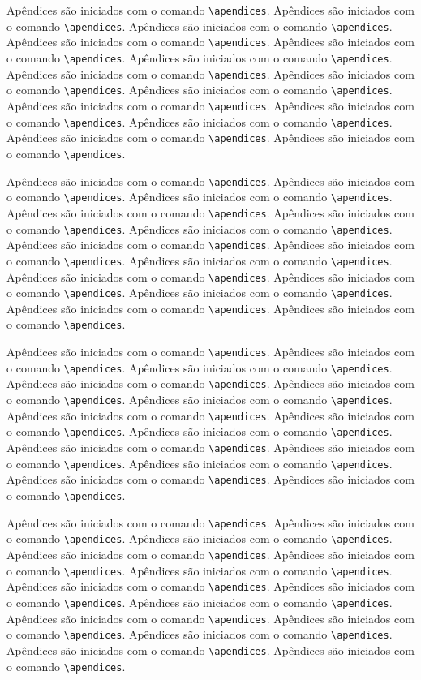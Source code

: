 Apêndices são iniciados com o comando \verb|\apendices|.
Apêndices são iniciados com o comando \verb|\apendices|.
Apêndices são iniciados com o comando \verb|\apendices|.
Apêndices são iniciados com o comando \verb|\apendices|.
Apêndices são iniciados com o comando \verb|\apendices|.
Apêndices são iniciados com o comando \verb|\apendices|.
Apêndices são iniciados com o comando \verb|\apendices|.
Apêndices são iniciados com o comando \verb|\apendices|.
Apêndices são iniciados com o comando \verb|\apendices|.
Apêndices são iniciados com o comando \verb|\apendices|.
Apêndices são iniciados com o comando \verb|\apendices|.
Apêndices são iniciados com o comando \verb|\apendices|.
Apêndices são iniciados com o comando \verb|\apendices|.
Apêndices são iniciados com o comando \verb|\apendices|.

Apêndices são iniciados com o comando \verb|\apendices|.
Apêndices são iniciados com o comando \verb|\apendices|.
Apêndices são iniciados com o comando \verb|\apendices|.
Apêndices são iniciados com o comando \verb|\apendices|.
Apêndices são iniciados com o comando \verb|\apendices|.
Apêndices são iniciados com o comando \verb|\apendices|.
Apêndices são iniciados com o comando \verb|\apendices|.
Apêndices são iniciados com o comando \verb|\apendices|.
Apêndices são iniciados com o comando \verb|\apendices|.
Apêndices são iniciados com o comando \verb|\apendices|.
Apêndices são iniciados com o comando \verb|\apendices|.
Apêndices são iniciados com o comando \verb|\apendices|.
Apêndices são iniciados com o comando \verb|\apendices|.
Apêndices são iniciados com o comando \verb|\apendices|.

Apêndices são iniciados com o comando \verb|\apendices|.
Apêndices são iniciados com o comando \verb|\apendices|.
Apêndices são iniciados com o comando \verb|\apendices|.
Apêndices são iniciados com o comando \verb|\apendices|.
Apêndices são iniciados com o comando \verb|\apendices|.
Apêndices são iniciados com o comando \verb|\apendices|.
Apêndices são iniciados com o comando \verb|\apendices|.
Apêndices são iniciados com o comando \verb|\apendices|.
Apêndices são iniciados com o comando \verb|\apendices|.
Apêndices são iniciados com o comando \verb|\apendices|.
Apêndices são iniciados com o comando \verb|\apendices|.
Apêndices são iniciados com o comando \verb|\apendices|.
Apêndices são iniciados com o comando \verb|\apendices|.
Apêndices são iniciados com o comando \verb|\apendices|.

Apêndices são iniciados com o comando \verb|\apendices|.
Apêndices são iniciados com o comando \verb|\apendices|.
Apêndices são iniciados com o comando \verb|\apendices|.
Apêndices são iniciados com o comando \verb|\apendices|.
Apêndices são iniciados com o comando \verb|\apendices|.
Apêndices são iniciados com o comando \verb|\apendices|.
Apêndices são iniciados com o comando \verb|\apendices|.
Apêndices são iniciados com o comando \verb|\apendices|.
Apêndices são iniciados com o comando \verb|\apendices|.
Apêndices são iniciados com o comando \verb|\apendices|.
Apêndices são iniciados com o comando \verb|\apendices|.
Apêndices são iniciados com o comando \verb|\apendices|.
Apêndices são iniciados com o comando \verb|\apendices|.
Apêndices são iniciados com o comando \verb|\apendices|.

